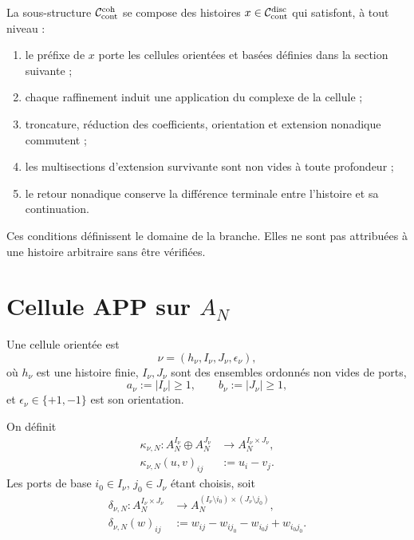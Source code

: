 La sous-structure \(\mathcal C_{\rm cont}^{\rm coh}\) se compose des histoires
\(x\in\mathcal C_{\rm cont}^{\rm disc}\) qui satisfont, à tout niveau :
\begin{enumerate}
 \item le préfixe de \(x\) porte les cellules orientées et basées définies dans
       la section suivante ;
 \item chaque raffinement induit une application du complexe de la cellule ;
 \item troncature, réduction des coefficients, orientation et extension
       nonadique commutent ;
 \item les multisections d'extension survivante sont non vides à toute
       profondeur ;
 \item le retour nonadique conserve la différence terminale entre l'histoire
       et sa continuation.
\end{enumerate}
Ces conditions définissent le domaine de la branche. Elles ne sont pas attribuées à une
histoire arbitraire sans être vérifiées.

\section{Cellule APP sur \texorpdfstring{\(A_N\)}{AN}}
\label{sec:pdfv2-coh-cell}

Une cellule orientée est
\[
 \nu=(h_\nu,I_\nu,J_\nu,\epsilon_\nu),
\]
où \(h_\nu\) est une histoire finie, \(I_\nu,J_\nu\) sont des ensembles
ordonnés non vides de ports,
\[
 a_\nu:=|I_\nu|\geq1,
 \qquad
 b_\nu:=|J_\nu|\geq1,
\]
et \(\epsilon_\nu\in\{+1,-1\}\) est son orientation.

On définit
\begin{equation}\label{eq:pdfv2-coh-kappa}
 \begin{aligned}
 \kappa_{\nu,N}:
 A_N^{I_\nu}\oplus A_N^{J_\nu}
 &\longrightarrow A_N^{I_\nu\times J_\nu},\\
 \kappa_{\nu,N}(u,v)_{ij}&:=u_i-v_j.
 \end{aligned}
\end{equation}
Les ports de base \(i_0\in I_\nu\), \(j_0\in J_\nu\) étant choisis, soit
\begin{equation}\label{eq:pdfv2-coh-delta}
 \begin{aligned}
 \delta_{\nu,N}:A_N^{I_\nu\times J_\nu}
 &\longrightarrow
 A_N^{(I_\nu\setminus i_0)\times(J_\nu\setminus j_0)},\\
 \delta_{\nu,N}(w)_{ij}
 &:={}
 w_{ij}-w_{i j_0}-w_{i_0j}+w_{i_0j_0}.
 \end{aligned}
\end{equation}

